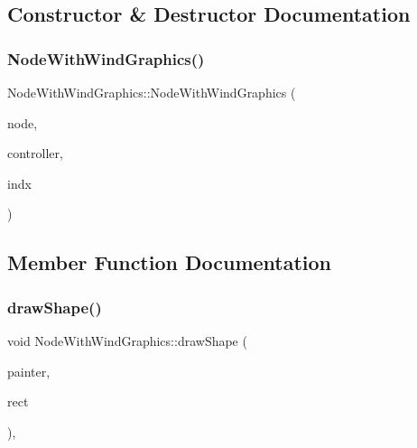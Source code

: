\subsection{Constructor \& Destructor Documentation}
\mbox{\label{class_node_with_wind_graphics_a39474f9538043c68234898723588e45a}} 
\subsubsection{\texorpdfstring{NodeWithWindGraphics()}{NodeWithWindGraphics()}}
{\footnotesize\ttfamily Node\+With\+Wind\+Graphics\+::\+Node\+With\+Wind\+Graphics (\begin{DoxyParamCaption}\item[{\mbox{\hyperlink{class_node_data}{Node\+Data}} $\ast$}]{node,  }\item[{\mbox{\hyperlink{class_map_objects_controller}{Map\+Objects\+Controller}} $\ast$}]{controller,  }\item[{int}]{indx }\end{DoxyParamCaption})\hspace{0.3cm}{\ttfamily [inline]}}



\subsection{Member Function Documentation}
\mbox{\label{class_node_with_wind_graphics_ada3f64e69262f7bb5a9e6f6c943b016c}} 
\subsubsection{\texorpdfstring{drawShape()}{drawShape()}}
{\footnotesize\ttfamily void Node\+With\+Wind\+Graphics\+::draw\+Shape (\begin{DoxyParamCaption}\item[{Q\+Painter \&}]{painter,  }\item[{const qmapcontrol\+::\+Rect\+World\+Px \&}]{rect }\end{DoxyParamCaption})\hspace{0.3cm}{\ttfamily [protected]}, {\ttfamily [virtual]}}



